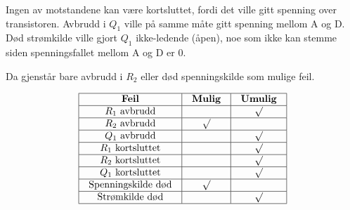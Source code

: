 Ingen av motstandene kan være kortsluttet, fordi det ville gitt spenning over transistoren. Avbrudd i $Q_1$ ville på samme måte gitt spenning mellom A og D. Død strømkilde ville gjort $Q_1$ ikke-ledende (åpen), noe som ikke kan stemme siden spenningsfallet mellom A og D er 0.

Da gjenstår bare avbrudd i $R_2$ eller død spenningskilde som mulige feil.


$$\vbox{\offinterlineskip
\halign{\strut
\vrule \quad\hfil # \ \hfil & 
\vrule \quad\hfil # \ \hfil & 
\vrule \quad\hfil # \ \hfil \vrule \cr
\noalign{\hrule}
%
{\bf Feil} & {\bf Mulig} & {\bf Umulig} \cr
%
\noalign{\hrule}
%
$R_1$ avbrudd &  & $\surd$ \cr
%
\noalign{\hrule}
%
$R_2$ avbrudd & $\surd$ &  \cr
%
\noalign{\hrule}
%
$Q_1$ avbrudd &  & $\surd$ \cr
%
\noalign{\hrule}
%
$R_1$ kortsluttet &  & $\surd$ \cr
%
\noalign{\hrule}
%
$R_2$ kortsluttet &  & $\surd$ \cr
%
\noalign{\hrule}
%
$Q_1$ kortsluttet &  & $\surd$ \cr
%
\noalign{\hrule}
%
Spenningskilde død & $\surd$ &  \cr
%
\noalign{\hrule}
%
Strømkilde død &  & $\surd$ \cr
%
\noalign{\hrule}
} %
}$$ %



